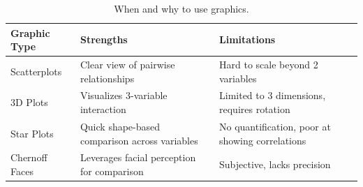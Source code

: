\begin{table}[!htp]
    \centering
    \begin{adjustbox}{width={\textwidth},totalheight={\textheight},keepaspectratio}
        \begin{tabular}{@{} l | l | l @{}}
            \toprule
            Graphic Type      & Strengths                                      & Limitations                                        \\
            \midrule
            Scatterplots      & Clear view of pairwise relationships           & Hard to scale beyond 2 variables                   \\ [.5em]
            3D Plots          & Visualizes 3-variable interaction              & Limited to 3 dimensions, requires rotation         \\ [.5em]
            Star Plots        & Quick shape-based comparison across variables  & No quantification, poor at showing correlations    \\ [.5em]
            Chernoff Faces    & Leverages facial perception for comparison     & Subjective, lacks precision                        \\
            \bottomrule
        \end{tabular}
    \end{adjustbox}
    \caption{When and why to use graphics.}
\end{table}
